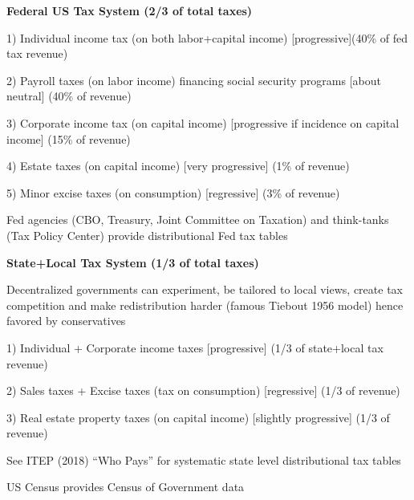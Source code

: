 \documentclass[landscape]{slides}
\begin{document}
\begin{slide}

\end{slide}




\begin{slide}
\begin{center}
{\bf Federal US Tax System (2/3 of total taxes)}
\end{center}
1) Individual income tax (on both labor+capital income)
[progressive](40\% of fed tax revenue)

2) Payroll taxes (on labor income) financing social security programs [about
neutral] (40\% of revenue)

3) Corporate income tax (on capital income) [progressive if incidence on
capital income] (15\% of revenue)

4) Estate taxes (on capital income) [very progressive] (1\% of
revenue)

5) Minor excise taxes (on consumption) [regressive] (3\%
of revenue)

Fed agencies (CBO, Treasury, Joint Committee on Taxation) and think-tanks (Tax Policy Center)
provide distributional Fed tax tables

\end{slide}


\begin{slide}
\begin{center}
{\bf State+Local Tax System (1/3 of total taxes)}
\end{center}
Decentralized governments can experiment, be tailored to local views, create tax competition and make redistribution harder (famous Tiebout 1956 model)
hence favored by conservatives

1) Individual + Corporate income taxes
[progressive] (1/3 of state+local tax revenue)

2) Sales taxes + Excise taxes (tax on consumption) [regressive] (1/3 of
revenue)

3) Real estate property taxes (on capital income)
[slightly progressive] (1/3 of revenue)

See ITEP (2018) ``Who Pays'' for systematic state level distributional tax tables

US Census provides Census of Government data


\end{slide}
\end{document}
